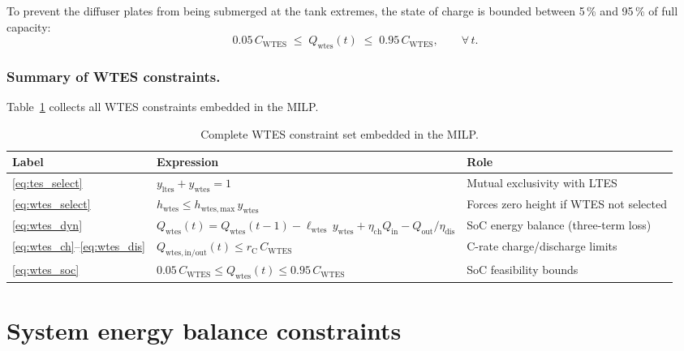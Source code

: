 \documentclass[11pt,a4paper]{report}
\begin{document}
To prevent the diffuser plates from being submerged at the tank extremes, the
state of charge is bounded between 5\,\% and 95\,\% of full capacity:
\begin{equation}
    0.05\,C_\mathrm{WTES} \;\leq\; Q_\mathrm{wtes}(t) \;\leq\; 0.95\,C_\mathrm{WTES},
    \qquad \forall\,t.
    \label{eq:wtes_soc}
\end{equation}

\subsubsection{Summary of WTES constraints.}

Table~\ref{tab:wtes_summary} collects all WTES constraints embedded in the MILP.

\begin{table}[H]
\centering
\caption{Complete WTES constraint set embedded in the MILP.}
\label{tab:wtes_summary}
\begin{tabular}{llp{5.5cm}}
\hline
\textbf{Label} & \textbf{Expression} & \textbf{Role} \\
\hline
\eqref{eq:tes_select}
    & $y_\mathrm{ltes} + y_\mathrm{wtes} = 1$
    & Mutual exclusivity with LTES \\
\eqref{eq:wtes_select}
    & $h_\mathrm{wtes} \leq h_\mathrm{wtes,max}\,y_\mathrm{wtes}$
    & Forces zero height if WTES not selected \\
\eqref{eq:wtes_dyn}
    & $Q_\mathrm{wtes}(t) = Q_\mathrm{wtes}(t-1) - \ell_\mathrm{wtes}\,y_\mathrm{wtes} + \eta_\mathrm{ch}Q_\mathrm{in} - Q_\mathrm{out}/\eta_\mathrm{dis}$
    & SoC energy balance (three-term loss) \\
\eqref{eq:wtes_ch}--\eqref{eq:wtes_dis}
    & $Q_\mathrm{wtes,in/out}(t) \leq r_\mathrm{C}\,C_\mathrm{WTES}$
    & C-rate charge/discharge limits \\
\eqref{eq:wtes_soc}
    & $0.05\,C_\mathrm{WTES} \leq Q_\mathrm{wtes}(t) \leq 0.95\,C_\mathrm{WTES}$
    & SoC feasibility bounds \\
\hline
\end{tabular}
\end{table}

\section{System energy balance constraints}
\label{sec:energy_balance}
\end{document}
